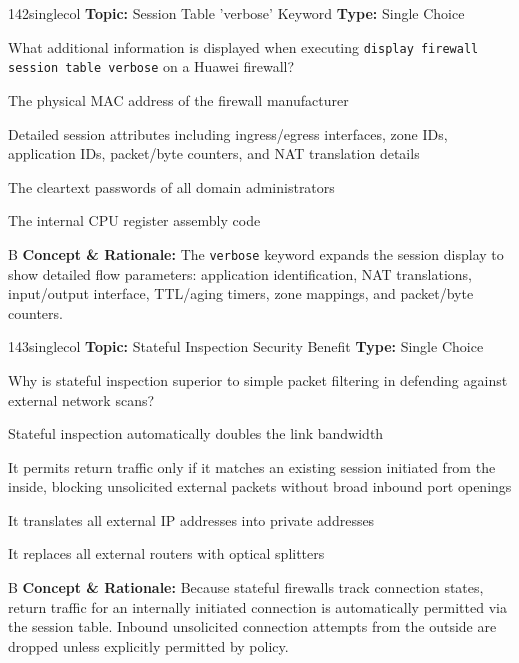 \begin{qcard}{142}{singlecol}
\textcolor{darkslate!75}{\small\textbf{Topic:} Session Table 'verbose' Keyword \hfill \textbf{Type:} Single Choice}\vspace{0.4em}\par
What additional information is displayed when executing \texttt{display firewall session table verbose} on a Huawei firewall?
\begin{qoptions}
\item The physical MAC address of the firewall manufacturer
\item Detailed session attributes including ingress/egress interfaces, zone IDs, application IDs, packet/byte counters, and NAT translation details
\item The cleartext passwords of all domain administrators
\item The internal CPU register assembly code
\end{qoptions}
\end{qcard}
\nopagebreak
\begin{explainbox}{B}
\textbf{Concept \& Rationale:} The \texttt{verbose} keyword expands the session display to show detailed flow parameters: application identification, NAT translations, input/output interface, TTL/aging timers, zone mappings, and packet/byte counters.
\end{explainbox}

\begin{qcard}{143}{singlecol}
\textcolor{darkslate!75}{\small\textbf{Topic:} Stateful Inspection Security Benefit \hfill \textbf{Type:} Single Choice}\vspace{0.4em}\par
Why is stateful inspection superior to simple packet filtering in defending against external network scans?
\begin{qoptions}
\item Stateful inspection automatically doubles the link bandwidth
\item It permits return traffic only if it matches an existing session initiated from the inside, blocking unsolicited external packets without broad inbound port openings
\item It translates all external IP addresses into private addresses
\item It replaces all external routers with optical splitters
\end{qoptions}
\end{qcard}
\nopagebreak
\begin{explainbox}{B}
\textbf{Concept \& Rationale:} Because stateful firewalls track connection states, return traffic for an internally initiated connection is automatically permitted via the session table. Inbound unsolicited connection attempts from the outside are dropped unless explicitly permitted by policy.
\end{explainbox}

